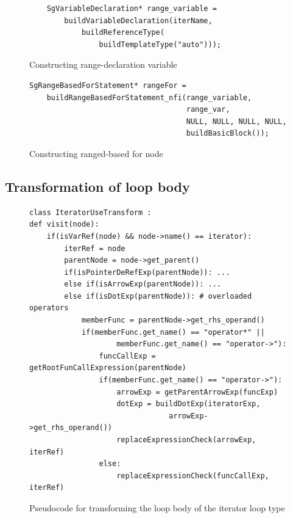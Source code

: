 \documentclass[bsc,frontabs,singlespacing,twoside,parskip,deptreport]{infthesis}
\begin{document}
\begin{figure}[H]
    \centering
    \begin{verbatim}
    SgVariableDeclaration* range_variable =
        buildVariableDeclaration(iterName, 
            buildReferenceType(
                buildTemplateType("auto"))); 
    \end{verbatim}
    \caption{Constructing range-declaration variable}
    \label{fig:range-dec-var}
\end{figure}

\begin{figure}[H]
    \centering
    \begin{verbatim}
SgRangeBasedForStatement* rangeFor =
    buildRangeBasedForStatement_nfi(range_variable,
                                    range_var,
                                    NULL, NULL, NULL, NULL,
                                    buildBasicBlock());    
    \end{verbatim}
    \caption{Constructing ranged-based for node}
    \label{fig:range-based-for-stmt}
\end{figure}

\subsection{Transformation of loop body}

\begin{figure}[H]
    \centering
    \begin{verbatim}
class IteratorUseTransform :
def visit(node):
    if(isVarRef(node) && node->name() == iterator):
        iterRef = node
        parentNode = node->get_parent()
        if(isPointerDeRefExp(parentNode)): ...
        else if(isArrowExp(parentNode)): ...
        else if(isDotExp(parentNode)): # overloaded operators
            memberFunc = parentNode->get_rhs_operand()
            if(memberFunc.get_name() == "operator*" ||
                    memberFunc.get_name() == "operator->"):
                funcCallExp = getRootFunCallExpression(parentNode)
                if(memberFunc.get_name() == "operator->"):
                    arrowExp = getParentArrowExp(funcExp)
                    dotExp = buildDotExp(iteratorExp,
                                arrowExp->get_rhs_operand())
                    replaceExpressionCheck(arrowExp, iterRef)
                else:
                    replaceExpressionCheck(funcCallExp, iterRef)
    \end{verbatim}
    \caption{Pseudocode for transforming the loop body of the iterator loop type }
    \label{fig:pse-code-trans-iter}
\end{figure}
\end{document}
